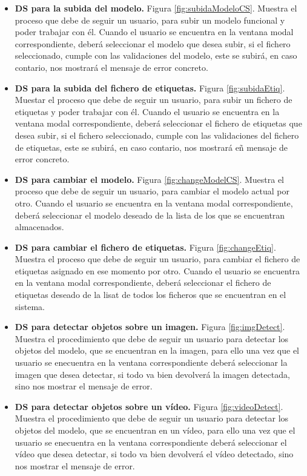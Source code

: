 \begin{itemize}
    \item \textbf{DS para la subida del modelo.} Figura \ref{fig:subidaModeloCS}. Muestra el proceso que debe de seguir un usuario, para subir un modelo funcional y poder trabajar con él. Cuando el usuario se encuentra en la ventana modal correspondiente, deberá seleccionar el modelo que desea
    subir, si el fichero seleccionado, cumple con las validaciones del modelo, este se subirá, en caso contario, nos mostrará el mensaje de error concreto.
    \item \textbf{DS para la subida del fichero de etiquetas.} Figura \ref{fig:subidaEtiq}. Muestar el proceso que debe de seguir un usuario, para subir un fichero de etiquetas y poder trabajar con él. Cuando el usuario se encuentra en la ventana modal correspondiente, deberá seleccionar el fichero de etiquetas que desea
    subir, si el fichero seleccionado, cumple con las validaciones del fichero de etiquetas, este se subirá, en caso contario, nos mostrará eñ mensaje de error concreto.
    \item \textbf{DS para cambiar el modelo.} Figura \ref{fig:changeModelCS}. Muestra el proceso que debe de seguir un usuario, para cambiar el modelo actual por otro. Cuando el usuario se encuentra en la ventana modal correspondiente, deberá seleccionar el modelo deseado de la lista de los que se encuentran almacenados.
    \item \textbf{DS para cambiar el fichero de etiquetas.} Figura \ref{fig:changeEtiq}. Muestra el proceso que debe de seguir un usuario, para cambiar el fichero de etiquetas asignado en ese momento por otro. Cuando el usuario se encuentra en la ventana modal correspondiente, deberá seleccionar el fichero de etiquetas deseado de la lisat de todos los ficheros que se encuentran en el sistema.
    \item \textbf{DS para detectar objetos sobre un imagen.} Figura \ref{fig:imgDetect}. Muestra el procedimiento que debe de seguir un usuario para detectar los objetos del modelo, que se encuentran en la imagen, para ello una vez que el usuario se enecuentra en la ventana correspondiente deberá seleccionar la imagen que desea detectar, si todo va bien devolverá la imagen detectada, sino nos mostrar el mensaje de error.
    \item \textbf{DS para detectar objetos sobre un vídeo.} Figura \ref{fig:videoDetect}. Muestra el procedimiento que debe de seguir un usuario para detectar los objetos del modelo, que se encuentran en un vídeo, para ello una vez que el usuario se enecuentra en la ventana correspondiente deberá seleccionar el vídeo que desea detectar, si todo va bien devolverá el vídeo detectado, sino nos mostrar el mensaje de error. 

\end{itemize}
